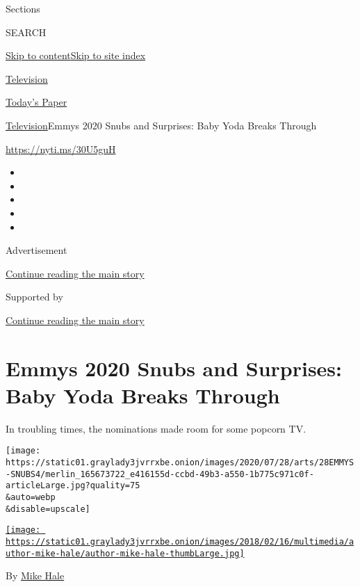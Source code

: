 Sections

SEARCH

\protect\hyperlink{site-content}{Skip to
content}\protect\hyperlink{site-index}{Skip to site index}

\href{https://www.nytimes3xbfgragh.onion/section/arts/television}{Television}

\href{https://myaccount.nytimes3xbfgragh.onion/auth/login?response_type=cookie\&client_id=vi}{}

\href{https://www.nytimes3xbfgragh.onion/section/todayspaper}{Today's
Paper}

\href{/section/arts/television}{Television}\textbar{}Emmys 2020 Snubs
and Surprises: Baby Yoda Breaks Through

\url{https://nyti.ms/30U5guH}

\begin{itemize}
\item
\item
\item
\item
\item
\end{itemize}

Advertisement

\protect\hyperlink{after-top}{Continue reading the main story}

Supported by

\protect\hyperlink{after-sponsor}{Continue reading the main story}

\hypertarget{emmys-2020-snubs-and-surprises-baby-yoda-breaks-through}{%
\section{Emmys 2020 Snubs and Surprises: Baby Yoda Breaks
Through}\label{emmys-2020-snubs-and-surprises-baby-yoda-breaks-through}}

In troubling times, the nominations made room for some popcorn TV.

\texttt{[image: https://static01.graylady3jvrrxbe.onion/images/2020/07/28/arts/28EMMYS-SNUBS4/merlin\_165673722\_e416155d-ccbd-49b3-a550-1b775c971c0f-articleLarge.jpg?quality=75\\\&auto=webp\\\&disable=upscale]}

\href{https://www.nytimes3xbfgragh.onion/by/mike-hale}{\texttt{[image: https://static01.graylady3jvrrxbe.onion/images/2018/02/16/multimedia/author-mike-hale/author-mike-hale-thumbLarge.jpg]}}

By \href{https://www.nytimes3xbfgragh.onion/by/mike-hale}{Mike Hale}

